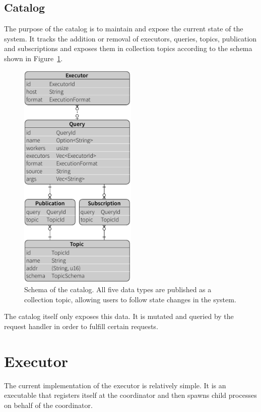 \subsection{Catalog}

The purpose of the catalog is to maintain and expose the current state of the
system. It tracks the addition or removal of executors, queries, topics,
publication and subscriptions and exposes them in collection topics according
to the schema shown in Figure~\ref{fig:model}.

\begin{figure}[htb]
  \centering
    \includegraphics[width=0.5\textwidth]{figures/model}
  \caption[Schema of the catalog.]{Schema of the catalog. All five data types
  are published as a collection topic, allowing users to follow state changes
  in the system.}
  \label{fig:model}
\end{figure}

The catalog itself only exposes this data. It is mutated and queried by the
request handler in order to fulfill certain requests.

\section{Executor}

The current implementation of the executor is relatively simple. It is an executable
that registers itself at the coordinator and then spawns child processes on behalf
of the coordinator.

